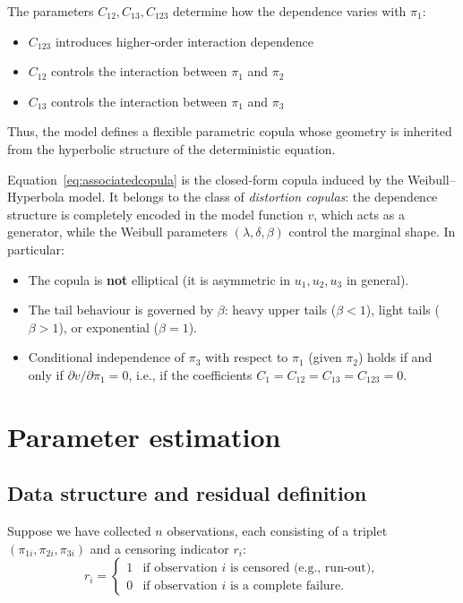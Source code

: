 The parameters \(C_{12},C_{13},C_{123}\) determine how the dependence varies with \(\pi_1\):
\begin{itemize}
\item \(C_{123}\) introduces higher‑order interaction dependence
\item \(C_{12}\) controls the interaction between \(\pi_1\) and \(\pi_2\)
\item \(C_{13}\) controls the interaction between \(\pi_1\) and \(\pi_3\)
\end{itemize}

Thus, the model defines a flexible parametric copula whose geometry is inherited from the hyperbolic structure of the deterministic equation.

\begin{remarkbox}
\begin{remarkT}
Equation~\eqref{eq:associatedcopula} is the closed‑form copula induced by the Weibull–Hyperbola model. It belongs to the class of \emph{distortion copulas}: the dependence structure is completely encoded in the model function \(v\), which acts as a generator, while the Weibull parameters \((\lambda,\delta,\beta)\) control the marginal shape. In particular:
\begin{itemize}
    \item The copula is \textbf{not} elliptical (it is asymmetric in \(u_1,u_2,u_3\) in general).
    \item The tail behaviour is governed by \(\beta\): heavy upper tails (\(\beta<1\)), light tails (\(\beta>1\)), or exponential (\(\beta=1\)).
    \item Conditional independence of \(\pi_3\) with respect to \(\pi_1\) (given \(\pi_2\)) holds if and only if \(\partial v/\partial\pi_1=0\), i.e., if the coefficients \(C_1=C_{12}=C_{13}=C_{123}=0\).
\end{itemize}
\end{remarkT}
\end{remarkbox}

\section{Parameter estimation}
\label{sec:estimation}

\subsection{Data structure and residual definition}

Suppose we have collected \(n\) observations, each consisting of a triplet \((\pi_{1i},\pi_{2i},\pi_{3i})\) and a censoring indicator \(r_i\):
\[
r_i = \begin{cases}
1 & \text{if observation $i$ is censored (e.g., run‑out)},\\
0 & \text{if observation $i$ is a complete failure}.
\end{cases}
\]

